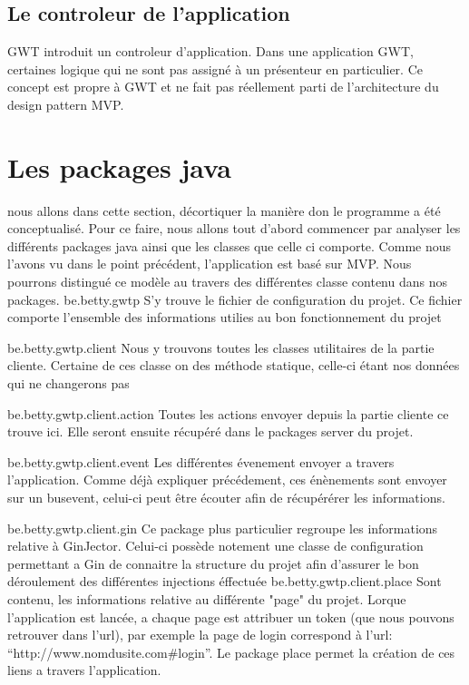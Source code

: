 \subsection{Le controleur de l'application} 
GWT introduit un controleur d'application. Dans une application GWT, certaines logique qui ne sont pas assigné à un présenteur en particulier. Ce concept est propre à GWT et ne fait pas réellement parti de l'architecture du design pattern MVP. 
 
\section{Les packages java}
nous allons dans cette section, décortiquer la manière don le programme a été conceptualisé. Pour ce faire, nous allons tout d'abord commencer par analyser les différents packages java ainsi que les classes que celle ci comporte. Comme nous l'avons vu dans le point précédent, l'application est basé sur MVP. Nous pourrons distingué ce modèle au travers des différentes classe contenu dans nos packages.
be.betty.gwtp
	S'y trouve le fichier de configuration du projet. Ce fichier comporte l'ensemble des informations utilies au bon fonctionnement du projet

be.betty.gwtp.client
	Nous y trouvons toutes les classes utilitaires de la partie cliente. Certaine de ces classe on des méthode statique, celle-ci étant nos données qui ne changerons pas 

be.betty.gwtp.client.action
	Toutes les actions envoyer depuis la partie cliente ce trouve ici. Elle seront ensuite récupéré dans le packages server du projet.

be.betty.gwtp.client.event
	Les différentes évenement envoyer a travers l'application. Comme déjà expliquer précédement, ces énènements sont envoyer sur un busevent, celui-ci peut être écouter afin de récupérérer les informations.

be.betty.gwtp.client.gin
	Ce package plus particulier regroupe les informations relative à GinJector. Celui-ci possède notement une classe de configuration permettant a Gin de connaitre la structure du projet afin d'assurer le bon déroulement des différentes injections éffectuée
be.betty.gwtp.client.place
Sont contenu, les informations relative au différente "page" du projet. Lorque l'application est lancée, a chaque page est attribuer un token (que nous pouvons retrouver dans l'url), par exemple la page de login correspond à l'url: \enquote{http://www.nomdusite.com\#login}. Le package place permet la création de ces liens a travers l'application.

